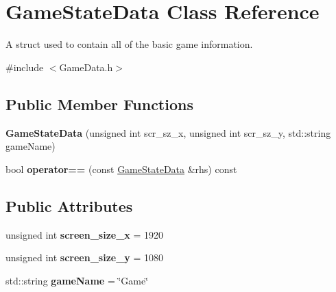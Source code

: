 \hypertarget{struct_game_state_data}{}\section{Game\+State\+Data Class Reference}
\label{struct_game_state_data}


A struct used to contain all of the basic game information.  




{\ttfamily \#include $<$Game\+Data.\+h$>$}

\subsection*{Public Member Functions}
\begin{DoxyCompactItemize}
\item 
\mbox{\label{struct_game_state_data_acb2da79775aed7c30863992956c1272e}} 
{\bfseries Game\+State\+Data} (unsigned int scr\+\_\+sz\+\_\+x, unsigned int scr\+\_\+sz\+\_\+y, std\+::string game\+Name)
\item 
\mbox{\label{struct_game_state_data_a1785e49ae998f451376aa910d5fe4ff1}} 
bool {\bfseries operator==} (const \hyperlink{struct_game_state_data}{Game\+State\+Data} \&rhs) const
\end{DoxyCompactItemize}
\subsection*{Public Attributes}
\begin{DoxyCompactItemize}
\item 
\mbox{\label{struct_game_state_data_a77ad6fb81bff60f557bca625796e7c4b}} 
unsigned int {\bfseries screen\+\_\+size\+\_\+x} = 1920
\item 
\mbox{\label{struct_game_state_data_a3e22c382b0b7a5cded66565b257e50e3}} 
unsigned int {\bfseries screen\+\_\+size\+\_\+y} = 1080
\item 
\mbox{\label{struct_game_state_data_a91d07a38bd67335ce65d01ec8f147411}} 
std\+::string {\bfseries game\+Name} = \char`\"{}Game\char`\"{}
\end{DoxyCompactItemize}


